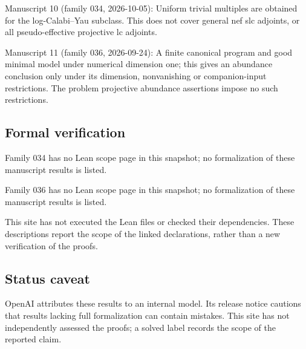 \documentclass[11pt]{article}
\begin{document}
Manuscript 10 (family 034, 2026-10-05): Uniform trivial multiples are obtained for the log-Calabi–Yau subclass. This does not cover general nef slc adjoints, or all pseudo-effective projective lc adjoints.

Manuscript 11 (family 036, 2026-09-24): A finite canonical program and good minimal model under numerical dimension one; this gives an abundance conclusion only under its dimension, nonvanishing or companion-input restrictions. The problem projective abundance assertions impose no such restrictions.

\subsection{Formal verification}
Family 034 has no Lean scope page in this snapshot; no formalization of these manuscript results is listed.

Family 036 has no Lean scope page in this snapshot; no formalization of these manuscript results is listed.

This site has not executed the Lean files or checked their dependencies. These descriptions report the scope of the linked declarations, rather than a new verification of the proofs.

\subsection{Status caveat}
OpenAI attributes these results to an internal model. Its release notice cautions that results lacking full formalization can contain mistakes. This site has not independently assessed the proofs; a solved label records the scope of the reported claim.
\end{document}
